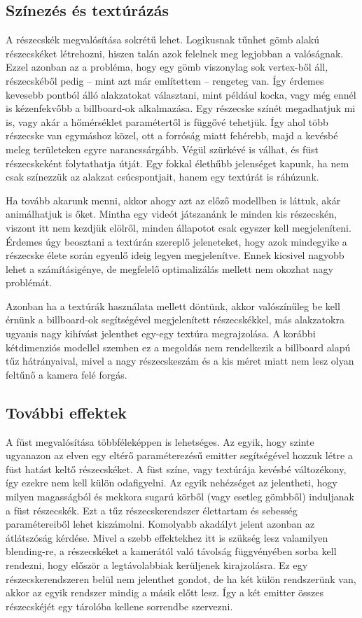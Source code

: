 \subsection{Színezés és textúrázás}
A részecskék megvalósítása sokrétű lehet. Logikusnak tűnhet gömb alakú részecskéket létrehozni, hiszen talán azok felelnek meg legjobban  a valóságnak. Ezzel azonban az a probléma, hogy egy gömb viszonylag sok vertex-ből áll, részecskéből pedig -- mint azt már említettem -- rengeteg van. Így érdemes kevesebb pontból álló alakzatokat választani, mint például kocka, vagy még ennél is kézenfekvőbb a billboard-ok alkalmazása. Egy részecske színét megadhatjuk mi is, vagy akár a hőmérséklet paramétertől is függővé tehetjük. Így ahol több részecske van egymáshoz közel, ott a forróság miatt fehérebb, majd a kevésbé meleg területeken egyre narancssárgább. Végül szürkévé is válhat, és füst részecskeként folytathatja útját. Egy fokkal élethűbb jelenséget kapunk, ha nem csak színezzük az alakzat csúcspontjait, hanem egy textúrát is ráhúzunk.

Ha tovább akarunk menni, akkor ahogy azt az előző modellben is láttuk, akár animálhatjuk is őket. Mintha egy videót játszanánk le minden kis részecskén, viszont itt nem kezdjük elölről, minden állapotot csak egyszer kell megjeleníteni. Érdemes úgy beosztani a textúrán szereplő jeleneteket, hogy azok mindegyike a részecske élete során egyenlő ideig legyen megjelenítve. Ennek kicsivel nagyobb lehet a számításigénye, de megfelelő optimalizálás mellett nem okozhat nagy problémát. 

Azonban ha a textúrák használata mellett döntünk, akkor valószínűleg be kell érnünk a billboard-ok segítségével megjelenített részecskékkel, más alakzatokra ugyanis nagy kihívást jelenthet egy-egy textúra megrajzolása. A korábbi kétdimenziós modellel szemben ez a megoldás nem rendelkezik a billboard alapú tűz hátrányaival, mivel a nagy részecskeszám és a kis méret miatt nem lesz olyan feltűnő a kamera felé forgás. 


\subsection{További effektek}
A füst megvalósítása többféleképpen is lehetséges. Az egyik, hogy szinte ugyanazon az elven egy eltérő paraméterezésű emitter segítségével hozzuk létre a füst hatást keltő részecskéket. A füst színe, vagy textúrája kevésbé változékony, így ezekre nem kell külön odafigyelni. Az egyik nehézséget az jelentheti, hogy milyen magasságból és mekkora sugarú körből (vagy esetleg gömbből) induljanak a füst részecskék. Ezt a tűz részecskerendszer élettartam és sebesség paramétereiből lehet kiszámolni. Komolyabb akadályt jelent azonban az átlátszóság kérdése. Mivel a szebb effektekhez itt is szükség lesz valamilyen blending-re, a részecskéket a kamerától való távolság függvényében sorba kell rendezni, hogy először a legtávolabbiak kerüljenek kirajzolásra. Ez egy részecskerendszeren belül nem jelenthet gondot, de ha két külön rendszerünk van, akkor az egyik rendszer mindig a másik előtt lesz. Így a két emitter összes részecskéjét egy tárolóba kellene sorrendbe szervezni.


